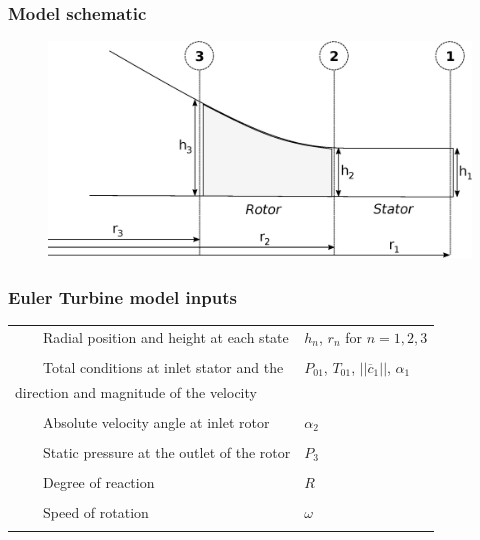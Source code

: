 \documentclass{beamer}
\newcommand{\tabitem}{~~\llap{\textbullet}~~}
\begin{document}
\begin{frame}
	\frametitle{Model schematic }
 	\begin{figure}
 	\includegraphics[scale=0.5]{images/eulerturbine.eps}
	 \end{figure}
\end{frame}



\begin{frame}
	\frametitle{Euler Turbine model inputs}
	\begin{tabular}{ll} 
		{\tabitem Radial position and height at each state} & $h_n$, $r_n$ for $n=1,2,3$ \\ \\
		{\tabitem Total conditions at inlet stator and the} & $P_{01}$, $T_{01}$, $||\overline c_1||$, $\alpha_1$ \\ 
		{         direction and magnitude of the velocity} & \\ \\
		{\tabitem Absolute velocity angle at inlet rotor} & $\alpha_2$ \\ \\
		{\tabitem Static pressure at the outlet of the rotor} & $P_3$ \\ \\
		{\tabitem Degree of reaction} & $R$ \\ \\
		{\tabitem Speed of rotation}  & $\omega$ \\ \\
	  \end{tabular}
\end{frame}
\end{document}
